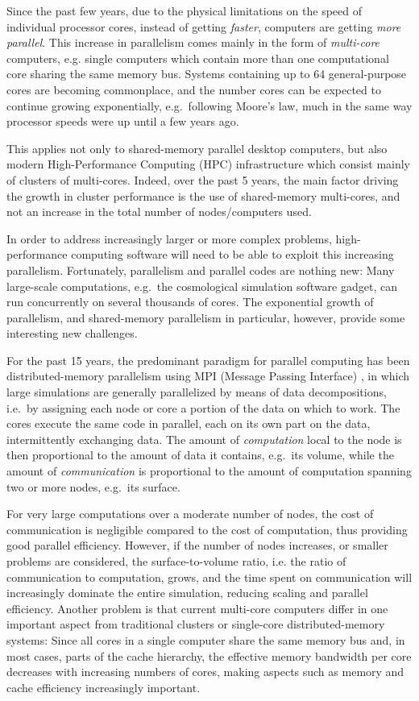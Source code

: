 \documentclass[final]{siamltex}
\begin{document}
Since the past few years, due to the physical limitations
on the speed of individual processor cores, instead of
getting {\em faster}, computers are getting {\em more parallel}.
This increase in parallelism comes mainly in the form of
{\em multi-core} computers, e.g. single computers which
contain more than one computational core sharing the 
same memory bus.
Systems containing up to 64 general-purpose cores are becoming
commonplace, and the number cores can be expected to continue
growing exponentially, e.g.~following Moore's law, much in the
same way processor speeds were up until a few years ago.

This applies not only to shared-memory parallel desktop
computers, but also modern High-Performance Computing (HPC)
infrastructure which consist mainly of clusters of multi-cores.
Indeed, over the past 5 years, the main factor driving the growth
in cluster performance is the use of shared-memory multi-cores,
and not an increase in the total number of nodes/computers used.

In order to address increasingly larger
or more complex problems, high-performance computing software
will need to be able to exploit this increasing parallelism.
Fortunately, parallelism and parallel codes are nothing new:
Many large-scale computations, e.g.~the cosmological
simulation software {\sc gadget}, can run concurrently
on several thousands of cores.
The exponential growth of parallelism, and shared-memory
parallelism in particular, however, provide some interesting 
new challenges.

For the past 15 years, the predominant paradigm for parallel
computing has been distributed-memory parallelism using MPI
(Message Passing Interface) \cite{ref:Snir1998},
in which large simulations are generally
parallelized by means of data decompositions, i.e.~by assigning
each node or core a portion of the data on which to work.
The cores execute the same code
in parallel, each on its own part on the data, intermittently exchanging data.
The amount of {\em computation} local to the node is then proportional
to the amount of data it contains, e.g.~its volume, while
the amount of {\em communication} is proportional to the
amount of computation spanning two or more nodes, e.g.~its
surface.

For very large computations over a moderate number of nodes,
the cost of communication is negligible compared to the
cost of computation, thus providing good parallel efficiency.
However, if the number of nodes increases, or 
smaller problems are considered, the surface-to-volume ratio,
i.e. the ratio of communication to computation,
grows, and the time spent on communication will increasingly
dominate the entire simulation, reducing scaling and parallel
efficiency.
Another problem is that current multi-core computers
differ in one important aspect from traditional clusters or
single-core distributed-memory
systems: Since all cores in a single computer share the same memory
bus and, in most cases, parts of the cache hierarchy,
the effective memory bandwidth per core decreases with
increasing numbers of cores,
making aspects such as memory and cache efficiency
increasingly important.
\end{document}
